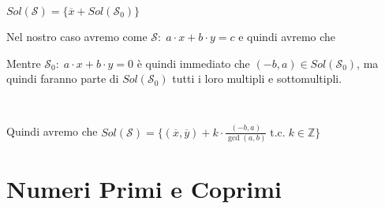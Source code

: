 \begin{boxA}
    {\centering
        $Sol(\mathcal{S}) = \{\overline{x} + Sol(\mathcal{S}_0)\}$
    \par}
    \begin{center}
        \begin{minipage}[t]{0.45\textwidth}
            \centering
            Nel nostro caso avremo come $\mathcal{S}: \; a \cdot x + b \cdot y = c$ e quindi avremo che 
        \end{minipage}
        \begin{minipage}[t]{0.45\textwidth}
            \centering
            Mentre $\mathcal{S}_0: \; a \cdot x + b \cdot y = 0$ è quindi immediato che $(-b, a) \in Sol(\mathcal{S}_0)$, ma quindi faranno parte di $Sol(\mathcal{S}_0)$ tutti i loro multipli e sottomultipli.
        \end{minipage} \\
    \end{center}

    Quindi avremo che $Sol(\mathcal{S}) = \{(\overline{x}, \overline{y}) + k \cdot \frac{(-b, a)}{\gcd (a, b)} \; \text{t.c.} \; k \in \mathbb{Z}\}$
\end{boxA}

\section{Numeri Primi e Coprimi}
